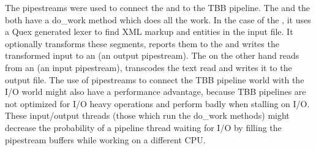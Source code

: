 The pipestreams were used to connect the  and
 to the TBB pipeline. The  and the
 both have a do\_\-work method which does all the work. In the
case of the , it uses a Quex generated lexer to find XML
markup and entities in the input file. It optionally transforms these
segments, reports them to the  and writes the
transformed input to an  (an output pipestream). The
 on the other hand reads from an  (an input
pipestream), transcodes the text read and writes it to the output file. The
use of pipestreams to connect the TBB pipeline world with the I/O world might
also have a performance advantage, because TBB pipelines are not optimized for
I/O heavy operations and perform badly when stalling on I/O. These
input/output threads (those which run the do\_\-work methods) might decrease
the probability of a pipeline thread waiting for I/O by filling the pipestream
buffers while working on a different CPU.
